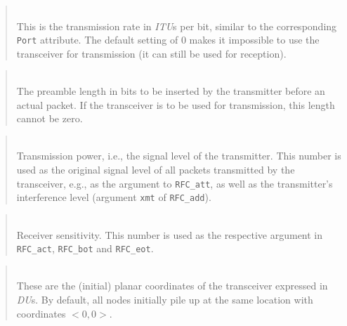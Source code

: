 \begin{quote}
\noindent{}\\ \hspace{0in}
This is the transmission rate in {\em ITU\/}s per bit,
similar to the corresponding {\tt Port} attribute.
The default setting of 0 makes it impossible to use the transceiver
for transmission (it can still be used for reception).
\end{quote}

\begin{quote}
\noindent{}\\ \hspace{0in}
The preamble length in bits to be inserted by the transmitter before
an actual packet.
If the transceiver is to be used for transmission, this
length cannot be zero.
\end{quote}

\begin{quote}
\noindent{}\\ \hspace{0in}
Transmission power, i.e., the signal level of the transmitter.
This number is used as the original signal level of all packets transmitted
by the transceiver, e.g., as the argument to {\tt RFC\_att}, as well as the
transmitter's interference level (argument {\tt xmt} of {\tt RFC\_add}).
\end{quote}

\begin{quote}
\noindent{}\\ \hspace{0in}
Receiver sensitivity.
This number is used as the respective argument
in {\tt RFC\_act}, {\tt RFC\_bot} and {\tt RFC\_eot}.
\end{quote}

\begin{quote}
\noindent{}\\ \hspace{0in}
These are the (initial) planar coordinates of the transceiver expressed
in {\em DU\/}s.
By default, all nodes initially pile up at the same location with
coordinates $<0,0>$.
\end{quote}


